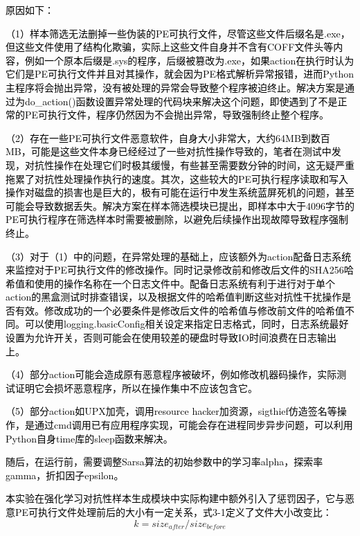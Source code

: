 \textcolor{black}{原因如下：}

\textcolor{black}{（1）样本筛选无法删掉一些伪装的PE可执行文件，尽管这些文件后缀名是.exe，但这些文件使用了结构化欺骗，实际上这些文件自身并不含有COFF文件头等内容，例如一个原本后缀是.sys的程序，后缀被篡改为.exe，如果action在执行时认为它们是PE可执行文件并且对其操作，就会因为PE格式解析异常报错，进而Python主程序将会抛出异常，没有被处理的异常会导致整个程序被迫终止。解决方案是通过为do\_action()函数设置异常处理的代码块来解决这个问题，即使遇到了不是正常的PE可执行文件，程序仍然因为不会抛出异常，导致强制终止整个程序。}

\textcolor{black}{（2）存在一些PE可执行文件恶意软件，自身大小非常大，大约64MB到数百MB，可能是这些文件本身已经经过了一些对抗性操作导致的，笔者在测试中发现，对抗性操作在处理它们时极其缓慢，有些甚至需要数分钟的时间，这无疑严重拖累了对抗性处理操作执行的速度。其次，这些较大的PE可执行程序读取和写入操作对磁盘的损害也是巨大的，极有可能在运行中发生系统蓝屏死机的问题，甚至可能会导致数据丢失。解决方案在样本筛选模块已提出，即样本中大于4096字节的PE可执行程序在筛选样本时需要被删除，以避免后续操作出现故障导致程序强制终止。}

\textcolor{black}{（3）对于（1）中的问题，在异常处理的基础上，应该额外为action配备日志系统来监控对于PE可执行文件的修改操作。同时记录修改前和修改后文件的SHA256哈希值和使用的操作名称在一个日志文件中。配备日志系统有利于进行对于单个action的黑盒测试时排查错误，以及根据文件的哈希值判断这些对抗性干扰操作是否有效。修改成功的一个必要条件是修改后文件的哈希值与修改前文件的哈希值不同。可以使用logging.basicConfig相关设定来指定日志格式，同时，日志系统最好设置为允许开关，否则可能会在使用较差的硬盘时导致IO时间浪费在日志输出上。}

\textcolor{black}{（4）部分action可能会造成原有恶意程序被破坏，例如修改机器码操作，实际测试证明它会损坏恶意程序，所以在操作集中不应该包含它。}

\textcolor{black}{（5）部分action如UPX加壳，调用resource hacker加资源，sigthief仿造签名等操作，是通过cmd调用已有应用程序实现，可能会存在进程同步异步问题，可以利用Python自身time库的sleep函数来解决。}

\textcolor{black}{随后，在运行前，需要调整Sarsa算法的初始参数中的学习率alpha，探索率gamma，折扣因子epsilon。}

\textcolor{black}{本实验在强化学习对抗性样本生成模块中实际构建中额外引入了惩罚因子，它与恶意PE可执行文件处理前后的大小有一定关系，式3-1定义了文件大小改变比：}
\begin{equation}
    k=size_{after}/size_{before}
\end{equation}

